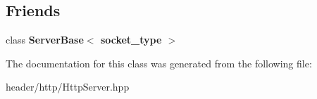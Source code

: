 \subsection*{Friends}
\begin{DoxyCompactItemize}
\item 
\mbox{\label{classhttp_1_1_server_base_1_1_response_a01d54a7e16ca437c98ec571deca98dfc}} 
class {\bfseries Server\+Base$<$ socket\+\_\+type $>$}
\end{DoxyCompactItemize}


The documentation for this class was generated from the following file\+:\begin{DoxyCompactItemize}
\item 
header/http/Http\+Server.\+hpp\end{DoxyCompactItemize}
